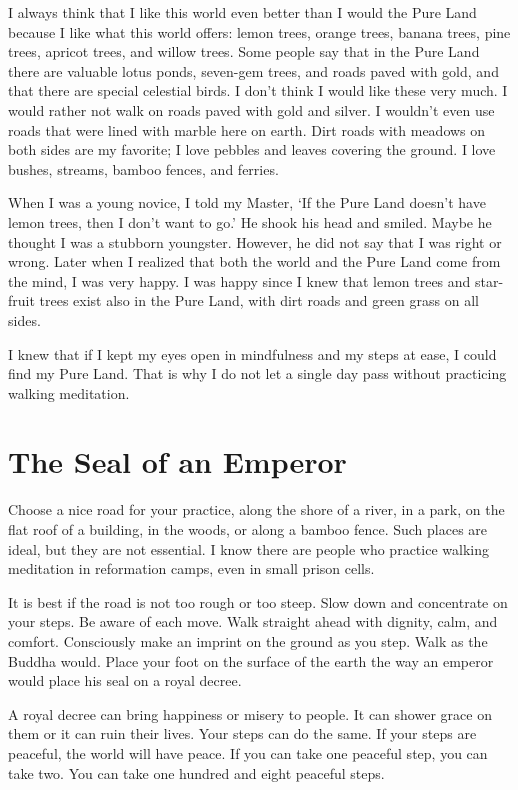\documentclass[a4paper,12pt,twocolumn]{article}
\begin{document}
  I always think that I like this world even better than I would the Pure Land because I like what this world offers: lemon trees, orange trees, banana trees, pine trees, apricot trees, and willow trees.  Some people say that in the Pure Land there are valuable lotus ponds, seven-gem trees, and roads paved with gold, and that there are special celestial birds.  I don’t think I would like these very much.  I would rather not walk on roads paved with gold and silver.  I wouldn’t even
  use roads that were lined with marble here on earth.  Dirt roads with meadows on both sides are my favorite; I love pebbles and leaves covering the ground.  I love bushes, streams, bamboo fences, and ferries. 

  When I was a young novice, I told my Master, ‘If the Pure Land doesn’t have lemon trees, then I don’t want to go.’  He shook his head and smiled.  Maybe he thought I was a stubborn youngster.  However, he did not say that I was right or wrong.  Later when I realized that both the world and the Pure Land come from the mind, I was very happy.  I was happy since I knew that lemon trees and star-fruit trees exist also in the Pure Land, with dirt roads and green grass on all sides.

  I knew that if I kept my eyes open in mindfulness and my steps at ease, I could find my Pure Land.  That is why I do not let a single day pass without practicing walking meditation.

   

  \section{The Seal of an Emperor}

  Choose a nice road for your practice, along the shore of a river, in a park, on the flat roof of a building, in the woods, or along a bamboo fence.  Such places are ideal, but they are not essential.  I know there are people who practice walking meditation in reformation camps, even in small prison cells.

  It is best if the road is not too rough or too steep.  Slow down and concentrate on your steps.  Be aware of each move.  Walk straight ahead with dignity, calm, and comfort.  Consciously make an imprint on the ground as you step.  Walk as the Buddha would.  Place your foot on the surface of the earth the way an emperor would place his seal on a royal decree.

  A royal decree can bring happiness or misery to people.  It can shower grace on them or it can ruin their lives.  Your steps can do the same.  If your steps are peaceful, the world will have peace.  If you can take one peaceful step, you can take two.  You can take one hundred and eight peaceful steps.
\end{document}
